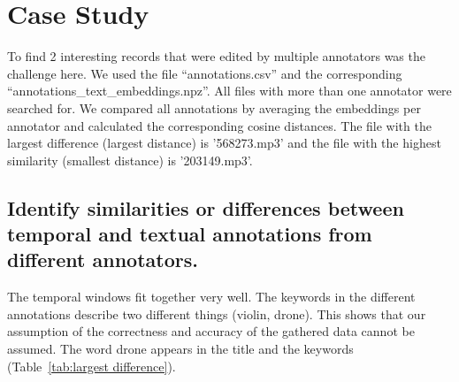 
\section{Case Study}
\label{sec:Case Study}

To find 2 interesting records that were edited by multiple annotators was the challenge here. 
We used the file ``annotations.csv'' and the corresponding ``annotations\_text\_embeddings.npz''. 
All files with more than one annotator were searched for. 
We compared all annotations by averaging the embeddings per annotator and calculated the corresponding cosine distances.
The file with the largest difference (largest distance) is '568273.mp3' and the file with the highest similarity (smallest distance) is '203149.mp3'.

\subsection{Identify similarities or differences between temporal and textual annotations from different annotators.}
\label{sec:Case Study:a}

The temporal windows fit together very well. The keywords in the different annotations describe two different things (violin, drone).
This shows that our assumption of the correctness and accuracy of the gathered data cannot be assumed. 
The word drone appears in the title and the keywords (Table~\ref{tab:largest difference}).


